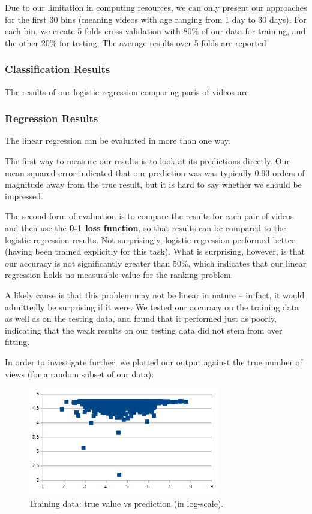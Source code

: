 Due to our limitation in computing resources, we can only present our approaches for the first 30 bins (meaning videos with age ranging from 1 day to 30 days). For each bin, we create 5 folds cross-validation with 80\% of our data for training, and the other 20\% for testing. The average results over 5-folds are reported 

\subsubsection{Classification Results}
	The results of our logistic regression comparing paris of videos are
	
	
\subsubsection{Regression Results}
	The linear regression can be evaluated in more than one way.
	
	The first way to measure our results is to look at its predictions directly.  Our mean squared error indicated that our prediction was was typically 0.93 orders of magnitude away from the true result, but it is hard to say whether we should be impressed.
	
	The second form of evaluation is to compare the results for each pair of videos and then use the \textbf{0-1 loss function}, so that results can be compared to the logistic regression results.  Not surprisingly, logistic regression performed better (having been trained explicitly for this task).  What is surprising, however, is that our accuracy is not significantly greater than 50\%, which indicates that our linear regression holds no measurable value for the ranking problem.
	
	A likely cause is that this problem may not be linear in nature -- in fact, it would admittedly be surprising if it were.  We tested our accuracy on the training data as well as on the testing data, and found that it performed just as poorly, indicating that the weak results on our testing data did not stem from over fitting.
	
	In order to investigate further, we plotted our output against the true number of views (for a random subset of our data):

	\begin{figure}[!h]
		\begin{center}
			\includegraphics[width=.75\textwidth,clip]{logistic regression training.png}
		\end{center}
		\caption{Training data: true value vs prediction (in log-scale).}
		\label{fig:trainingTrueVsPredicted}
	\end{figure}
	
